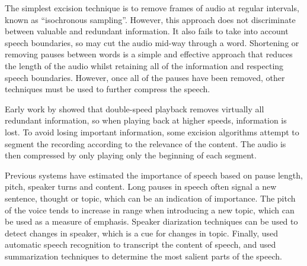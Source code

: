 
%

The simplest excision technique is to remove frames of audio at regular intervals, known as ``isochronous sampling''.
However, this approach does not discriminate between valuable and redundant information. It also fails to take into
account speech boundaries, so may cut the audio mid-way through a word. Shortening or removing pauses between words is
a simple and effective approach that reduces the length of the audio whilst retaining all of the information and
respecting speech boundaries. However, once all of the pauses have been removed, other techniques must be used to
further compress the speech.

Early work by \citet{Heiman1986} showed that double-speed playback removes virtually all redundant information, so when
playing back at higher speeds, information is lost. To avoid losing important information, some excision algorithms
attempt to segment the recording according to the relevance of the content. The audio is then compressed by only
playing only the beginning of each segment.

Previous systems have estimated the importance of speech based on pause length, pitch, speaker turns and content.  Long
pauses in speech often signal a new sentence, thought or topic, which can be an indication of importance. The pitch of
the voice tends to increase in range when introducing a new topic, which can be used as a measure of emphasis.  Speaker
diarization techniques \citep{AngueraMiro2012} can be used to detect changes in speaker, which is a cue for changes in
topic. Finally, \citet{Hori2003} used automatic speech recognition to transcript the content of speech, and used
summarization techniques to determine the most salient parts of the speech.

